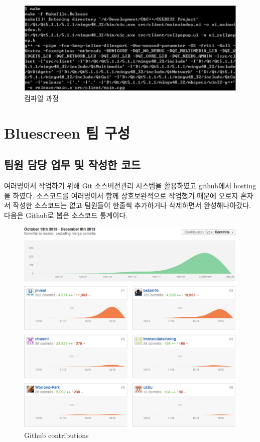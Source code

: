\documentclass[10pt,oneside,a4paper,titlepage]{article}
\begin{document}
\begin{figure}[htbp]
\centering
\includegraphics[scale=0.8]{images/compile2}
\caption{컴파일 과정}
\end{figure}

\section{Bluescreen 팀 구성}

\subsection{팀원 담당 업무 및 작성한 코드}

여러명이서 작업하기 위해 Git 소스버전관리 시스템을 활용하였고 github에서 hosting을 하였다. 소스코드를 여러명이서 함께 상호보완적으로 작업했기 때문에 오로지 혼자서 작성한 소스코드는 없고 팀원들이 한줄씩 추가하거나 삭제하면서 완성해나아갔다. 다음은 Github로 뽑은 소스코드 통계이다.

\begin{figure}[H]
\centering
\includegraphics[scale=0.8]{images/github}
\caption{Github contributions}
\end{figure}
\end{document}
